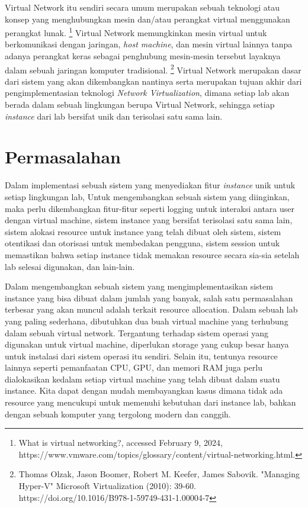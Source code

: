 Virtual Network itu sendiri secara umum merupakan sebuah teknologi atau konsep yang menghubungkan mesin dan/atau perangkat virtual 
menggunakan perangkat lunak. 
\footnote{What is virtual networking?, accessed February 9, 2024, https://www.vmware.com/topics/glossary/content/virtual-networking.html.} 
Virtual Network memungkinkan mesin virtual untuk berkomunikasi dengan jaringan, \textit{host machine}, dan mesin virtual 
lainnya tanpa adanya perangkat keras sebagai penghubung mesin-mesin tersebut layaknya dalam sebuah jaringan komputer tradisional. 
\footnote{Thomas Olzak, Jason Boomer, Robert M. Keefer, James Sabovik. "Managing Hyper-V" Microsoft Virtualization (2010): 39-60. https://doi.org/10.1016/B978-1-59749-431-1.00004-7} 
Virtual Network merupakan dasar dari sistem yang akan dikembangkan nantinya serta merupakan tujuan akhir dari pengimplementasian teknologi \textit{Network Virtualization},
dimana setiap lab akan berada dalam sebuah lingkungan berupa Virtual Network, sehingga setiap \textit{instance} dari lab bersifat unik dan terisolasi satu sama lain.
\par

\section{Permasalahan}
\label{sec:masalah}
Dalam implementasi sebuah sistem yang menyediakan fitur \textit{instance} unik untuk setiap lingkungan lab, 
Untuk mengembangkan sebuah sistem yang diinginkan, maka perlu dikembangkan fitur-fitur seperti logging untuk interaksi antara user dengan virtual machine,
sistem instance yang bersifat terisolasi satu sama lain, sistem alokasi resource untuk instance yang telah dibuat oleh sistem, sistem otentikasi dan otorisasi untuk membedakan pengguna,
sistem session untuk memastikan bahwa setiap instance tidak memakan resource secara sia-sia setelah lab selesai digunakan, dan lain-lain. 


Dalam mengembangkan sebuah sistem yang mengimplementasikan sistem instance yang bisa dibuat dalam jumlah yang banyak,
salah satu permasalahan terbesar yang akan muncul adalah terkait resource allocation.
Dalam sebuah lab yang paling sederhana, dibutuhkan dua buah virtual machine yang terhubung dalam sebuah virtual network.
Tergantung terhadap sistem operasi yang digunakan untuk virtual machine, diperlukan storage yang cukup besar hanya untuk instalasi dari sistem operasi itu sendiri.
Selain itu, tentunya resource lainnya seperti pemanfaatan CPU, GPU, dan memori RAM juga perlu dialokasikan kedalam setiap virtual machine yang telah dibuat dalam suatu instance.
Kita dapat dengan mudah membayangkan kasus dimana tidak ada resource yang mencukupi untuk memenuhi kebutuhan dari instance lab, bahkan dengan sebuah komputer yang tergolong modern dan canggih.
\par

